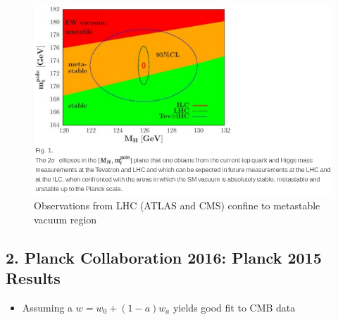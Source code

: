 \documentclass{article}
\begin{document}
\begin{figure}[h]
\begin{center}
\includegraphics[width=\textwidth,angle=0.]{vacuumEnergy.png}
\end{center}
\caption{Observations from LHC (ATLAS and CMS) confine to metastable vacuum region}
\end{figure}

\subsection*{2. Planck Collaboration 2016: Planck 2015 Results}
\begin{itemize}
\item Assuming a $w=w_0+(1-a)w_a$ yields good fit to CMB data
\end{itemize}
\end{document}
